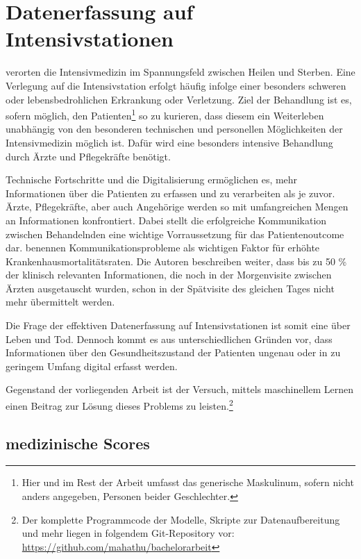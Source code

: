 \section{Datenerfassung auf Intensivstationen}
\cite{marxIntensivmedizin2015c} verorten die Intensivmedizin im Spannungsfeld zwischen Heilen und Sterben. Eine Verlegung auf die Intensivstation erfolgt häufig infolge einer besonders schweren oder lebensbedrohlichen Erkrankung oder Verletzung. 
Ziel der Behandlung ist es, sofern möglich, den Patienten\footnote{Hier und im Rest der Arbeit umfasst das generische Maskulinum, sofern nicht anders angegeben, Personen beider Geschlechter.} so zu kurieren, dass diesem ein Weiterleben unabhängig von den besonderen technischen und personellen Möglichkeiten der Intensivmedizin möglich ist. Dafür wird eine besonders intensive Behandlung durch Ärzte und Pflegekräfte benötigt.

Technische Fortschritte und die Digitalisierung ermöglichen es, mehr Informationen über die Patienten zu erfassen und zu verarbeiten als je zuvor. Ärzte, Pflegekräfte, aber auch Angehörige werden so mit umfangreichen Mengen an Informationen konfrontiert. Dabei stellt die erfolgreiche Kommunikation zwischen Behandelnden eine wichtige Vorraussetzung für das Patientenoutcome dar. \cite{marxIntensivmedizin2015c} benennen Kommunikationsprobleme als wichtigen Faktor für erhöhte Krankenhausmortalitätsraten. Die Autoren beschreiben weiter, dass bis zu 50 \% der klinisch relevanten Informationen, die noch in der Morgenvisite zwischen Ärzten ausgetauscht wurden, schon in der Spätvisite des gleichen Tages nicht mehr übermittelt werden. %

Die Frage der effektiven Datenerfassung auf Intensivstationen ist somit eine über Leben und Tod. Dennoch kommt es aus unterschiedlichen Gründen vor, dass Informationen über den Gesundheitszustand der Patienten ungenau oder in zu geringem Umfang digital erfasst werden. 

Gegenstand der vorliegenden Arbeit ist der Versuch, mittels maschinellem Lernen einen Beitrag zur Lösung dieses Problems zu leisten.\footnote{Der komplette Programmcode der Modelle, Skripte zur Datenaufbereitung und mehr liegen in folgendem Git-Repository vor: \url{https://github.com/mahathu/bachelorarbeit}}

\subsection{medizinische Scores} \label{section:scores}

